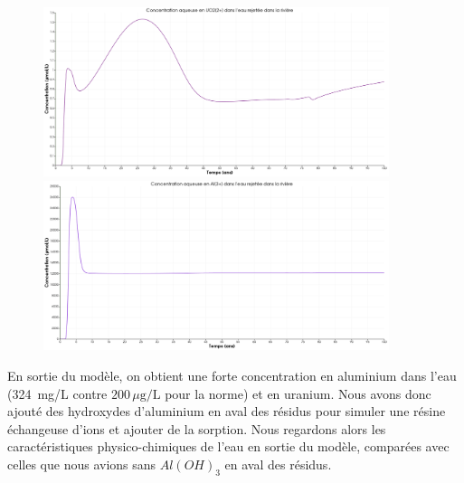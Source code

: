 \documentclass{article}
\begin{document}
\begin{figure}[H]
    \centering
    \begin{minipage}{0.5\textwidth}
        \centering
        \includegraphics[width=0.9\textwidth]{III_B_2_20.png} 
        \caption{}
        \label{fig:UO2_riviere_Al}
    \end{minipage}\hfill
    \begin{minipage}{0.5\textwidth}
        \centering
        \includegraphics[width=0.9\textwidth]{III_B_2_21.png} 
        \caption{}
        \label{fig:Al_riviere_Al}
    \end{minipage}
\end{figure}


En sortie du modèle, on obtient une forte concentration en aluminium dans l’eau (324~mg/L contre $200 \, \mu \text{g/L}$ pour la norme) et en uranium. Nous avons donc ajouté des hydroxydes d’aluminium en aval des résidus pour simuler une résine échangeuse d’ions et ajouter de la sorption.
Nous regardons alors les caractéristiques physico-chimiques de l’eau en sortie du modèle, comparées avec celles que nous avions sans $Al(OH)_3$ en aval des résidus.
\end{document}
